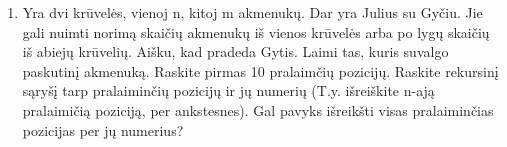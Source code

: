 \begin{enumerate}
  \item Yra dvi krūvelės, vienoj n, kitoj m akmenukų. Dar yra Julius su Gyčiu.
    Jie gali nuimti norimą skaičių akmenukų iš vienos krūvelės arba po lygų
    skaičių iš abiejų krūvelių. Aišku, kad pradeda Gytis. Laimi tas, kuris
    suvalgo paskutinį akmenuką. Raskite pirmas 10 pralaimčių pozicijų. Raskite
    rekursinį sąryšį tarp pralaiminčių pozicijų ir jų numerių (T.y. išreiškite
    n-ają pralaimičią poziciją, per ankstesnes). Gal pavyks išreikšti visas
    pralaiminčias pozicijas per jų numerius?

\end{enumerate}
